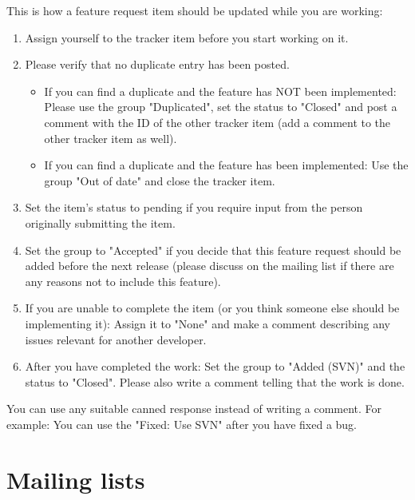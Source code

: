 \documentclass[12pt]{book}
\begin{document}
This is how a feature request item should be updated while you are
working:

\begin{enumerate}
\item Assign yourself to the tracker item before you start working on it.

\item Please verify that no duplicate entry has been posted.

\begin{itemize}
\item If you can find a duplicate and the feature has NOT been
  implemented: Please use the group "Duplicated", set the status to
  "Closed" and post a comment with the ID of the other tracker item
  (add a comment to the other tracker item as well).

\item If you can find a duplicate and the feature has been
  implemented: Use the group "Out of date" and close the tracker item.
\end{itemize}

\item Set the item's status to pending if you require input from the person
   originally submitting the item.

\item Set the group to "Accepted" if you decide that this feature
   request should be added before the next release (please discuss on
   the mailing list if there are any reasons not to include this
   feature).

\item If you are unable to complete the item (or you think someone else
   should be implementing it): Assign it to "None" and make a comment
   describing any issues relevant for another developer.

\item After you have completed the work: Set the group to "Added (SVN)"
   and the status to "Closed". Please also write a comment telling that
   the work is done.
\end{enumerate}

You can use any suitable canned response instead of writing a comment.
For example: You can use the "Fixed: Use SVN" after you have fixed a bug.


\hypertarget{Mailing lists}{\section{Mailing lists}}
\end{document}
